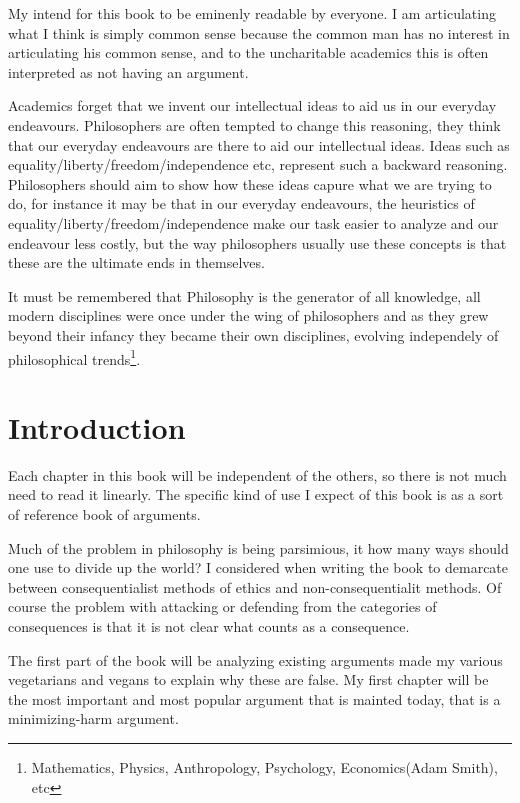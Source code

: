 \documentclass[12pt]{report}
\numberwithin{equation}{section}
\begin{document}
My intend for this book to be eminenly readable by everyone. I am articulating what I think is simply common sense because the common man has no interest in articulating his common sense, and to the uncharitable academics this is often interpreted as not having an argument. 

Academics forget that we invent our intellectual ideas to aid us in our everyday endeavours. Philosophers are often tempted to change this reasoning, they think that our everyday endeavours are there to aid our intellectual ideas. Ideas such as equality/liberty/freedom/independence etc, represent such a backward reasoning. Philosophers should aim to show how these ideas capure what we are trying to do, for instance it may be that in our everyday endeavours, the heuristics of equality/liberty/freedom/independence make our task easier to analyze and our endeavour less costly, but the way philosophers usually use these concepts is that these are the ultimate ends in themselves. 


It must be remembered that Philosophy is the generator of all knowledge, all modern disciplines were once under the wing of philosophers and as they grew beyond their infancy they became their own disciplines, evolving independely of philosophical trends\footnote{Mathematics, Physics, Anthropology, Psychology, Economics(Adam Smith), etc}. 


\chapter{Introduction}


Each chapter in this book will be independent of the others, so there is not much need to read it linearly. The specific kind of use I expect of this book is as a sort of reference book of arguments. 

Much of the problem in philosophy is being parsimious, it how many ways should one use to divide up the world? I considered when writing the book to demarcate between consequentialist methods of ethics and non-consequentialit methods. Of course the problem with attacking or defending from the categories of consequences is that it is not clear what counts as a consequence. 

The first part of the book will be analyzing existing arguments made my various vegetarians and vegans to explain why these are false. My first chapter will be the most important and most popular argument that is mainted today, that is a minimizing-harm argument. 
\end{document}
